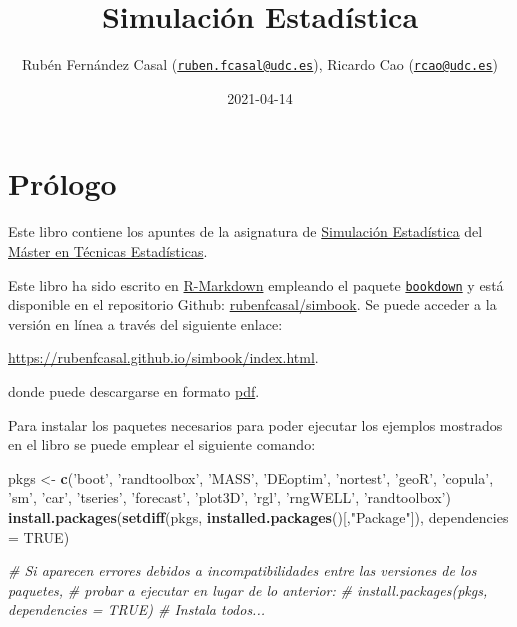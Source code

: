 \documentclass[
]{book}
\title{Simulación Estadística}
\author{Rubén Fernández Casal (\href{mailto:ruben.fcasal@udc.es}{\nolinkurl{ruben.fcasal@udc.es}}), Ricardo Cao (\href{mailto:rcao@udc.es}{\nolinkurl{rcao@udc.es}})}
\date{2021-04-14}
\newenvironment{Shaded}{\begin{snugshade}}{\end{snugshade}}
\newcommand{\CommentTok}[1]{\textcolor[rgb]{0.56,0.35,0.01}{\textit{#1}}}
\newcommand{\DataTypeTok}[1]{\textcolor[rgb]{0.13,0.29,0.53}{#1}}
\newcommand{\KeywordTok}[1]{\textcolor[rgb]{0.13,0.29,0.53}{\textbf{#1}}}
\newcommand{\NormalTok}[1]{#1}
\newcommand{\OtherTok}[1]{\textcolor[rgb]{0.56,0.35,0.01}{#1}}
\newcommand{\StringTok}[1]{\textcolor[rgb]{0.31,0.60,0.02}{#1}}
\theoremstyle{break}
\theoremstyle{definition}
\theoremstyle{definition}
\theoremstyle{definition}
\theoremstyle{remark}
\begin{document}
\maketitle

{
\setcounter{tocdepth}{1}
\tableofcontents
}
\hypertarget{pruxf3logo}{%
\chapter*{Prólogo}\label{pruxf3logo}}

Este libro contiene los apuntes de la asignatura de \href{http://eamo.usc.es/pub/mte/index.php/es/?option=com_content\&view=article\&id=2201\&idm=13\&a\%C3\%B1o=2019}{Simulación Estadística} del \href{http://eio.usc.es/pub/mte}{Máster en Técnicas Estadísticas}.

Este libro ha sido escrito en \href{http://rmarkdown.rstudio.com}{R-Markdown} empleando el paquete \href{https://bookdown.org/yihui/bookdown/}{\texttt{bookdown}} y está disponible en el repositorio Github: \href{https://github.com/rubenfcasal/simbook}{rubenfcasal/simbook}.
Se puede acceder a la versión en línea a través del siguiente enlace:

\url{https://rubenfcasal.github.io/simbook/index.html}.

donde puede descargarse en formato \href{https://rubenfcasal.github.io/simbook/Simulacion.pdf}{pdf}.

Para instalar los paquetes necesarios para poder ejecutar los ejemplos mostrados en el libro se puede emplear el siguiente comando:

\begin{Shaded}
\begin{Highlighting}[]
\NormalTok{pkgs <-}\StringTok{ }\KeywordTok{c}\NormalTok{(}\StringTok{'boot'}\NormalTok{, }\StringTok{'randtoolbox'}\NormalTok{, }\StringTok{'MASS'}\NormalTok{, }\StringTok{'DEoptim'}\NormalTok{, }\StringTok{'nortest'}\NormalTok{, }\StringTok{'geoR'}\NormalTok{, }\StringTok{'copula'}\NormalTok{, }\StringTok{'sm'}\NormalTok{,}
          \StringTok{'car'}\NormalTok{, }\StringTok{'tseries'}\NormalTok{, }\StringTok{'forecast'}\NormalTok{, }\StringTok{'plot3D'}\NormalTok{, }\StringTok{'rgl'}\NormalTok{, }\StringTok{'rngWELL'}\NormalTok{, }\StringTok{'randtoolbox'}\NormalTok{)}
\KeywordTok{install.packages}\NormalTok{(}\KeywordTok{setdiff}\NormalTok{(pkgs, }\KeywordTok{installed.packages}\NormalTok{()[,}\StringTok{"Package"}\NormalTok{]), }
                 \DataTypeTok{dependencies =} \OtherTok{TRUE}\NormalTok{)}

\CommentTok{# Si aparecen errores debidos a incompatibilidades entre las versiones de los paquetes, }
\CommentTok{# probar a ejecutar en lugar de lo anterior:}
\CommentTok{# install.packages(pkgs, dependencies = TRUE) # Instala todos...}
\end{Highlighting}
\end{Shaded}
\end{document}

